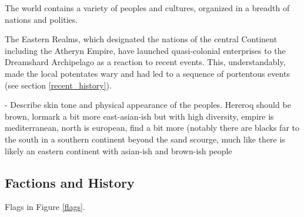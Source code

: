 The world contains a variety of peoples and cultures, organized in a breadth of nations and polities.

The Eastern Realms, which designated the nations of the central Continent including the Atheryn Empire, have launched quasi-colonial enterprises to the Dreamshard Archipelago as a reaction to recent events. This, understandably, made the local potentates wary and had led to a sequence of portentous events (see section \ref{recent_history}).






- Describe skin tone and physical appearance of the peoples. Hereroq should be brown, lormark a bit more east-asian-ish but with high diversity, empire is mediterranean, north is european, find a bit more (notably there are blacks far to the south in a southern continent beyond the sand scourge, much like there is likely an eastern continent with asian-ish and brown-ish people



\subsection{Factions and History}

Flags in Figure \ref{flags}.

